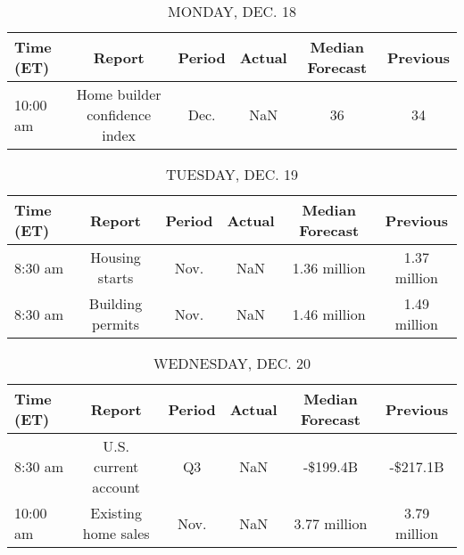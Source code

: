 \documentclass{article}%
\begin{document}
%
\normalsize%


\begin{table}[htbp]%
\caption{MONDAY, DEC. 18}%
\centering%
\begin{adjustbox}{width=1\textwidth}%
\begin{tabular}{lccccc}
\toprule
Time (ET) &                        Report & Period & Actual & Median Forecast & Previous \\
\midrule
 10:00 am & Home builder confidence index &   Dec. &    NaN &              36 &       34 \\
\bottomrule
\end{tabular}
%
\end{adjustbox}%
\end{table}

%


\begin{table}[htbp]%
\caption{TUESDAY, DEC. 19}%
\centering%
\begin{adjustbox}{width=1\textwidth}%
\begin{tabular}{lccccc}
\toprule
Time (ET) &           Report & Period & Actual & Median Forecast &     Previous \\
\midrule
  8:30 am &   Housing starts &   Nov. &    NaN &    1.36 million & 1.37 million \\
  8:30 am & Building permits &   Nov. &    NaN &    1.46 million & 1.49 million \\
\bottomrule
\end{tabular}
%
\end{adjustbox}%
\end{table}

%


\begin{table}[htbp]%
\caption{WEDNESDAY, DEC. 20}%
\centering%
\begin{adjustbox}{width=1\textwidth}%
\begin{tabular}{lccccc}
\toprule
Time (ET) &               Report & Period & Actual & Median Forecast &     Previous \\
\midrule
  8:30 am & U.S. current account &     Q3 &    NaN &        -\$199.4B &     -\$217.1B \\
 10:00 am &  Existing home sales &   Nov. &    NaN &    3.77 million & 3.79 million \\
\bottomrule
\end{tabular}
%
\end{adjustbox}%
\end{table}

%
\end{document}
